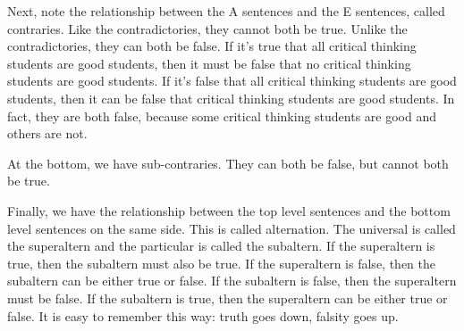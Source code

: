 \documentclass[../logic-text.tex]{subfiles}
\begin{document}
Next, note the relationship between the A sentences and the E sentences, called contraries. Like the contradictories, they cannot both be true. Unlike the contradictories, they can both be false. If it's true that all critical thinking students are good students, then it must be false that no critical thinking students are good students. If it's false that all critical thinking students are good students, then it can be false that critical thinking students are good students. In fact, they are both false, because some critical thinking students are good and others are not. 

\medskip
{}

At the bottom, we have sub-contraries. They can both be false, but cannot both be true.

\medskip
{}

Finally, we have the relationship between the top level sentences and the bottom level sentences on the same side. This is called alternation. The universal is called the superaltern and the particular is called the subaltern. If the superaltern is true, then the subaltern must also be true. If the superaltern is false, then the subaltern can be either true or false. If the subaltern is false, then the superaltern must be false. If the subaltern is true, then the superaltern can be either true or false. It is easy to remember this way: truth goes down, falsity goes up.
\end{document}
